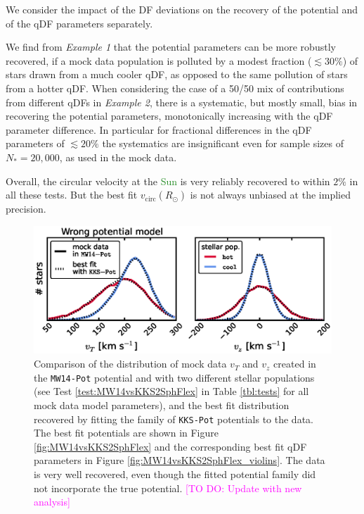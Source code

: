 \documentclass[iop,revtex4]{emulateapj}
\newcommand{\NEW}[1]{\textcolor{ForestGreen}{#1}}
\newcommand{\Wilma}[1]{\textcolor{Magenta}{#1}}
\newcommand{\OLD}[1]{}
\begin{document}
We consider the impact of the DF deviations on the recovery of the potential and of the qDF parameters separately. 

We find from \emph{Example 1} that the potential parameters can be more robustly recovered, if a mock data population is polluted by a modest fraction ($\lesssim 30\%$) of stars drawn from a much cooler qDF, as opposed to the same pollution of stars from a hotter qDF. When considering the case of a 50/50 mix of contributions from different qDFs in \emph{Example 2}, there is a systematic, but mostly small, bias in recovering the potential parameters, monotonically increasing with the qDF parameter difference. In particular for fractional differences in the qDF parameters of $\lesssim 20\%$ the systematics are insignificant even for sample sizes of $N_{*} = 20,000$, as used in the mock data.

Overall, the circular velocity at the \OLD{sun}\NEW{Sun} is very reliably recovered to within $2\%$ in all these tests. But the best fit $v_\text{circ}(R_\odot)$ is not always unbiased at the implied precision.

\begin{figure}[!htbp]
\centering
\includegraphics[width=\columnwidth]{figs/MW14vsKKS2SphFlex_mockdata_residuals_3.eps}
\caption{Comparison of the distribution of mock data $v_T$ and $v_z$ created in the \texttt{MW14-Pot} potential and with two different stellar populations (see Test \ref{test:MW14vsKKS2SphFlex} in Table \ref{tbl:tests} for all mock data model parameters), and the best fit distribution recovered by fitting the family of \texttt{KKS-Pot} potentials to the data. The best fit potentials are shown in Figure \ref{fig:MW14vsKKS2SphFlex} and the corresponding best fit qDF parameters in Figure \ref{fig:MW14vsKKS2SphFlex_violins}. The data is very well recovered, even though the fitted potential family did not incorporate the true potential. \Wilma{[TO DO: Update with new analysis]}}
\label{fig:MW14vsKKS2SphFlex_mockdata_residuals}
\end{figure}
\end{document}
